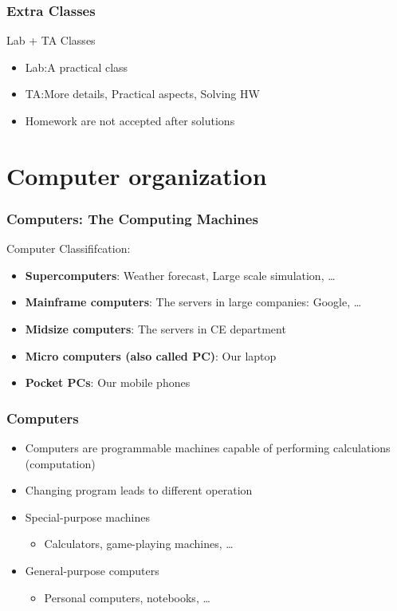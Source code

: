 \documentclass{../c-lecture}
\begin{document}
\begin{frame}
  \frametitle{Extra Classes}
  Lab + TA Classes

  \begin{itemize}
    \item Lab:\@ A practical class
    \item TA:\@ More details, Practical aspects, Solving HW
    \item Homework are not accepted after solutions
  \end{itemize}
\end{frame}

\section{Computer organization}

\begin{frame}
  \frametitle{Computers: The Computing Machines}
  Computer Classififcation:
  \begin{itemize}
    \item \textbf{Supercomputers}:\@
    Weather forecast, Large scale simulation, \ldots
    \item \textbf{Mainframe computers}:\@
    The servers in large companies: Google, \ldots
    \item \textbf{Midsize computers}:\@
    The servers in CE department
    \item \textbf{Micro computers (also called PC)}:\@
    Our laptop
    \item \textbf{Pocket PCs}:\@
    Our mobile phones
  \end{itemize}
\end{frame}

\begin{frame}
  \frametitle{Computers}
  \begin{itemize}
    \item Computers are programmable machines capable of performing calculations (computation)
    \item Changing program leads to different operation
    \item Special-purpose machines
    \begin{itemize}
      \item Calculators, game-playing machines, \ldots
    \end{itemize}
    \item General-purpose computers
    \begin{itemize}
      \item Personal computers, notebooks, \ldots
    \end{itemize}
  \end{itemize}
\end{frame}
\end{document}
